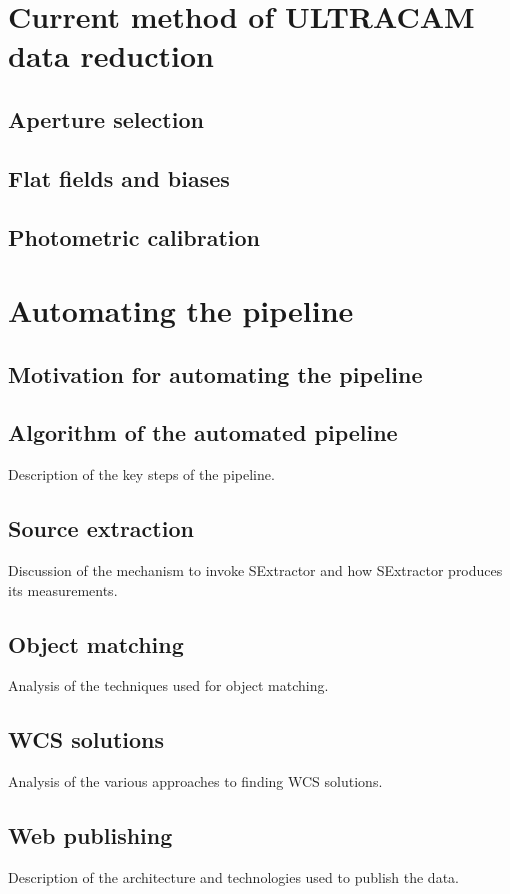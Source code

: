 \section{Current method of ULTRACAM data reduction}

\subsection{Aperture selection}

\subsection{Flat fields and biases}

\subsection{Photometric calibration}

\section{Automating the pipeline}

\subsection{Motivation for automating the pipeline}

\subsection{Algorithm of the automated pipeline} 

Description of the key steps of the pipeline. 

\subsection{Source extraction}

Discussion of the mechanism to invoke SExtractor and how SExtractor produces its measurements. 

\subsection{Object matching}

Analysis of the techniques used for object matching.

\subsection{WCS solutions}

Analysis of the various approaches to finding WCS solutions.

\subsection{Web publishing}

Description of the architecture and technologies used to publish the data. 
